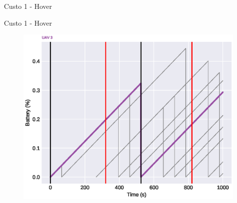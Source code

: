 \begin{frame}{Custo 1 - Hover}
\begin{figure}[!htb]
                 \end{figure}
            \end{frame}\begin{frame}{Custo 1 - Hover}
                \begin{figure}[!htb]
                     \includegraphics[width=\textwidth]{custo_1/uav_hover_acum_uav_3.eps}
                 \end{figure}
            \end{frame}